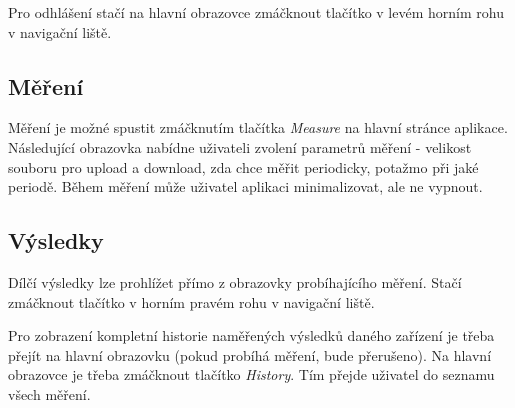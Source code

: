 Pro odhlášení stačí na hlavní obrazovce zmáčknout tlačítko v levém horním rohu v navigační liště.

\subsection{Měření}
Měření je možné spustit zmáčknutím tlačítka \emph{Measure} na hlavní stránce aplikace. Následující obrazovka nabídne uživateli zvolení parametrů měření - velikost souboru pro upload a download, zda chce měřit periodicky, potažmo při jaké periodě.
Během měření může uživatel aplikaci minimalizovat, ale ne vypnout.

\subsection{Výsledky}
Dílčí výsledky lze prohlížet přímo z obrazovky probíhajícího měření. Stačí zmáčknout tlačítko  v horním pravém rohu v navigační liště.

Pro zobrazení kompletní historie naměřených výsledků daného zařízení je třeba přejít na hlavní obrazovku (pokud probíhá měření, bude přerušeno). Na hlavní obrazovce je třeba zmáčknout tlačítko \emph{History}. Tím přejde uživatel do seznamu všech měření.